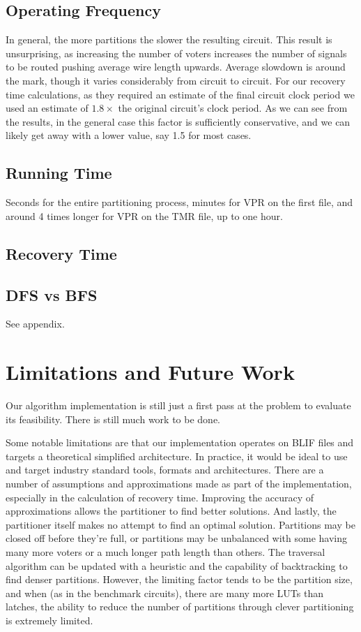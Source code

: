 \documentclass[12pt,final,oneside]{dwThesis} %
\begin{document}
   \section{Operating Frequency}
   In general, the more partitions the slower the resulting circuit. This result is unsurprising, as increasing the number of voters increases the number of signals to be routed pushing average wire length upwards. Average slowdown is around the  mark, though it varies considerably from circuit to circuit.
   For our recovery time calculations, as they required an estimate of the final circuit clock period we used an estimate of $1.8\times$ the original circuit's clock period. As we can see from the results, in the general case this factor is sufficiently conservative, and we can likely get away with a lower value, say 1.5 for most cases.
   
   \section{Running Time}
   	Seconds for the entire partitioning process, minutes for VPR on the first file, and around 4 times longer for VPR on the TMR file, up to one hour. 

   \section{Recovery Time}
   
   \section{DFS vs BFS}
   See appendix. 


   \chapter{Limitations and Future Work}
   Our algorithm implementation is still just a first pass at the problem to evaluate its feasibility. There is still much work to be done.
   
   Some notable limitations are that our implementation operates on \ac{BLIF} files and targets a theoretical simplified architecture. In practice, it would be ideal to use and target industry standard tools, formats and architectures.
   There are a number of assumptions and approximations made as part of the implementation, especially in the calculation of recovery time. Improving the accuracy of approximations allows the partitioner to find better solutions.
   And lastly, the partitioner itself makes no attempt to find an optimal solution. Partitions may be closed off before they're full, or partitions may be unbalanced with some having many more voters or a much longer path length than others.
   The traversal algorithm can be updated with a heuristic and the capability of backtracking to find denser partitions. However, the limiting factor tends to be the partition size, and when (as in the benchmark circuits), there are many more \acp{LUT} than latches, the ability to reduce the number of partitions through clever partitioning is extremely limited.
\end{document}
